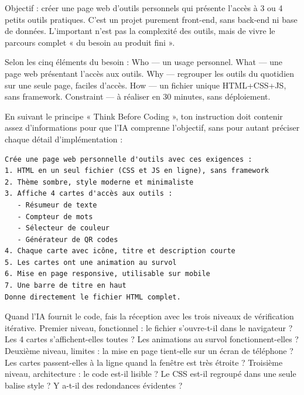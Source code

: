 



Objectif : créer une page web d'outils personnels qui présente l'accès à 3 ou 4 petits outils pratiques. C'est un projet purement front-end, sans back-end ni base de données. L'important n'est pas la complexité des outils, mais de vivre le parcours complet « du besoin au produit fini ».

Selon les cinq éléments du besoin : Who — un usage personnel. What — une page web présentant l'accès aux outils. Why — regrouper les outils du quotidien sur une seule page, faciles d'accès. How — un fichier unique HTML+CSS+JS, sans framework. Constraint — à réaliser en 30 minutes, sans déploiement.


En suivant le principe « Think Before Coding », ton instruction doit contenir assez d'informations pour que l'IA comprenne l'objectif, sans pour autant préciser chaque détail d'implémentation :

\begin{lstlisting}
Crée une page web personnelle d'outils avec ces exigences :
1. HTML en un seul fichier (CSS et JS en ligne), sans framework
2. Thème sombre, style moderne et minimaliste
3. Affiche 4 cartes d'accès aux outils :
   - Résumeur de texte
   - Compteur de mots
   - Sélecteur de couleur
   - Générateur de QR codes
4. Chaque carte avec icône, titre et description courte
5. Les cartes ont une animation au survol
6. Mise en page responsive, utilisable sur mobile
7. Une barre de titre en haut
Donne directement le fichier HTML complet.
\end{lstlisting}


Quand l'IA fournit le code, fais la réception avec les trois niveaux de vérification itérative. Premier niveau, fonctionnel : le fichier s'ouvre-t-il dans le navigateur ? Les 4 cartes s'affichent-elles toutes ? Les animations au survol fonctionnent-elles ? Deuxième niveau, limites : la mise en page tient-elle sur un écran de téléphone ? Les cartes passent-elles à la ligne quand la fenêtre est très étroite ? Troisième niveau, architecture : le code est-il lisible ? Le CSS est-il regroupé dans une seule balise style ? Y a-t-il des redondances évidentes ?

